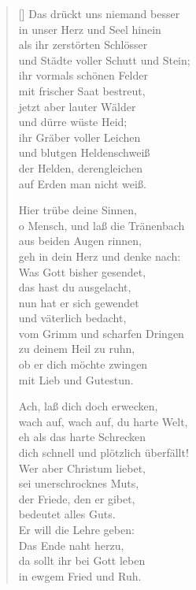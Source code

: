 \begin{multicols}{2}
\begin{verse}[\versewidth]
 Das drückt uns niemand besser\\
in unser Herz und Seel hinein\\
als ihr zerstörten Schlösser\\
und Städte voller Schutt und Stein;\\
ihr vormals schönen Felder\\
mit frischer Saat bestreut,\\
jetzt aber lauter Wälder\\
und dürre wüste Heid;\\
ihr Gräber voller Leichen\\
und blutgen Heldenschweiß\\
der Helden, derengleichen\\
auf Erden man nicht weiß.

 Hier trübe deine Sinnen,\\
o Mensch, und laß die Tränenbach\\
aus beiden Augen rinnen,\\
geh in dein Herz und denke nach:\\
Was Gott bisher gesendet,\\
das hast du ausgelacht,\\
nun hat er sich gewendet\\
und väterlich bedacht,\\
vom Grimm und scharfen Dringen\\
zu deinem Heil zu ruhn,\\
ob er dich möchte zwingen\\
mit Lieb und Gutestun.

 Ach, laß dich doch erwecken,\\
wach auf, wach auf, du harte Welt,\\
eh als das harte Schrecken\\
dich schnell und plötzlich überfällt!\\
Wer aber Christum liebet,\\
sei unerschrocknes Muts,\\
der Friede, den er gibet,\\
bedeutet alles Guts.\\
Er will die Lehre geben:\\
Das Ende naht herzu,\\
da sollt ihr bei Gott leben\\
in ewgem Fried und Ruh.

\end{verse}
\end{multicols}
